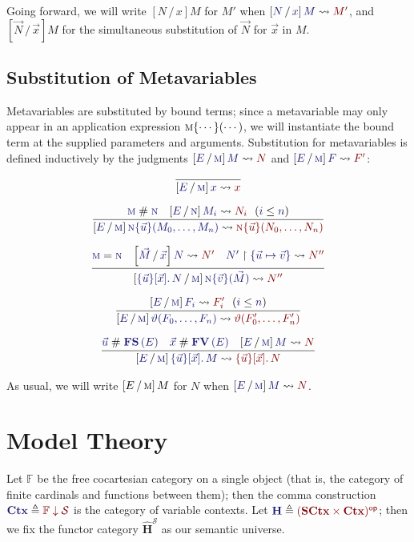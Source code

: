 \documentclass[11pt]{article}
\theoremstyle{definition}
\theoremstyle{remark}
\numberwithin{equation}{section}
\def\IModeColorName{MidnightBlue}
\def\OModeColorName{Maroon}
\newcommand\IMode[1]{{\color{\IModeColorName}{#1}}}
\newcommand\OMode[1]{{\color{\OModeColorName}{#1}}}
\newcommand\HypJ[2]{#1\ \ (#2)}
\newcommand\MkSet[1]{\left\{#1\right\}}
\newcommand\MkBTm[3]{\{#1\}[#2].\, #3}
\newcommand\Leq[2]{\IMode{#1}\leq\IMode{#2}}
\newcommand\FinSets{\mathbb{F}}
\newcommand\Sorts{\mathcal{S}}
\newcommand\SCtx{\mathbf{SCtx}}
\newcommand\Ctx{\mathbf{Ctx}}
\newcommand\HypCat{\mathbf{H}}
\newcommand\OpCat[1]{#1^{\mathsf{op}}}
\newcommand\Comma[2]{#1 \downarrow#2}
\newcommand\MV[1]{\textsc{#1}}
\newcommand\MApp[3]{#1\{#2\}(#3)}
\newcommand\App[2]{#1(#2)}
\newcommand\FV[1]{\mathbf{FV}\left(#1\right)}
\newcommand\FS[1]{\mathbf{FS}\left(#1\right)}
\newcommand\Rename[2]{%
  #2\upharpoonright#1%
}
\newcommand\IsRenaming[3]{%
  \Rename{\IMode{#1}}{\IMode{#2}}%
  \leadsto\OMode{#3}%
}
\newcommand\Subst[3]{%
  \left[#1\, /\, #2\right]#3%
}
\newcommand\IsSubst[4]{%
  \Subst{\IMode{#1}}{\IMode{#2}}{\IMode{#3}}%
  \leadsto\OMode{#4}%
}
\newcommand\IsEq[2]{\IMode{#1} = \IMode{#2}}
\newcommand\IsApart[2]{\IMode{#1} \mathrel{\#} \IMode{#2}}
\newcommand\Define[2]{\IMode{#1}\triangleq\OMode{#2}}
\begin{document}
Going forward, we will write $\Subst{N}{x}{M}$ for $M'$ when
$\IsSubst{N}{x}{M}{M'}$, and $\Subst{\vec{N}}{\vec{x}}{M}$ for the
simultaneous substitution of $\vec{N}$ for $\vec{x}$ in $M$.

\subsection{Substitution of Metavariables}

Metavariables are substituted by bound terms; since a metavariable may only
appear in an application expression $\MApp{\MV{m}}{\cdots}{\cdots}$, we will
instantiate the bound term at the supplied parameters and arguments.
Substitution for metavariables is defined inductively by the judgments
$\IsSubst{E}{\MV{m}}{M}{N}$ and $\IsSubst{E}{\MV{m}}{F}{F'}$:

\begin{gather*}
  \infer{
    \IsSubst{E}{\MV{m}}{x}{x}
  }{
  }\\[6pt]
  \infer{
    \IsSubst{E}{\MV{m}}{
      \MApp{\MV{n}}{\vec{u}}{M_0,\dots,M_n}
    }{
      \MApp{\MV{n}}{\vec{u}}{N_0,\dots,N_n}
    }
  }{
    \IsApart{\MV{m}}{\MV{n}} &
    \HypJ{
      \IsSubst{E}{\MV{n}}{M_i}{N_i}
    }{
      \Leq{i}{n}
    }
  }\\[6pt]
  \infer{
    \IsSubst{
      \MkBTm{\vec{u}}{\vec{x}}{N}
    }{\MV{m}}{
      \MApp{\MV{n}}{\vec{v}}{\vec{M}}
    }{
      N''
    }
  }{
    \IsEq{\MV{m}}{\MV{n}} &
    \IsSubst{\vec{M}}{\vec{x}}{N}{N'} &
    \IsRenaming{\MkSet{\vec{u}\mapsto\vec{v}}}{N'}{N''}
  }\\[6pt]
  \infer{
    \IsSubst{E}{\MV{m}}{
      \App{\vartheta}{F_0,\dots,F_n}
    }{
      \App{\vartheta}{F'_0,\dots,F'_n}
    }
  }{
    \HypJ{
      \IsSubst{E}{\MV{m}}{F_i}{F'_i}
    }{
      \Leq{i}{n}
    }
  }\\[6pt]
  \infer{
    \IsSubst{E}{\MV{m}}{
      \MkBTm{\vec{u}}{\vec{x}}{M}
    }{
      \MkBTm{\vec{u}}{\vec{x}}{N}
    }
  }{
    \IsApart{\vec{u}}{\FS{E}} &
    \IsApart{\vec{x}}{\FV{E}} &
    \IsSubst{E}{\MV{m}}{M}{N}
  }
\end{gather*}

As usual, we will write $\Subst{E}{\MV{m}}{M}$ for $N$ when
$\IsSubst{E}{\MV{m}}{M}{N}$.

\section{Model Theory}

Let $\FinSets$ be the free cocartesian category on a single object (that is,
the category of finite cardinals and functions between them); then the comma
construction $\Define{\Ctx}{\Comma{\FinSets}{\Sorts}}$ is the category of
variable contexts. Let $\Define{\HypCat}{\OpCat{(\SCtx\times\Ctx)}}$; then we
fix the functor category $\widehat{\HypCat}^\Sorts$ as our semantic universe.
\end{document}
